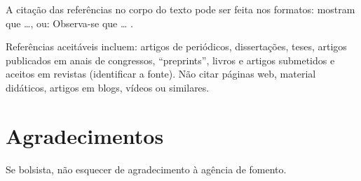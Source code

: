 \documentclass[
	article,			%
	10pt,				%
	oneside,			%
	a4paper,			%
  twocolumn,			%
	english,			%
	brazil,				%
	sumario=tradicional,
	]{abntex2}
\begin{document}
A citação das referências no corpo do texto pode ser feita nos formatos:
 mostram que \dots, ou: Observa-se que \dots
\cite{van86,guizzardi2005,masolo2010}.

Referências aceitáveis incluem: artigos de periódicos, dissertações, teses, artigos
publicados em anais de congressos, ``preprints'', livros e artigos submetidos e aceitos em
revistas (identificar a fonte). Não citar páginas web, material didáticos, artigos em
blogs, vídeos ou similares.

\section{Agradecimentos}

Se bolsista, não esquecer de agradecimento à agência de fomento.


\end{document}
